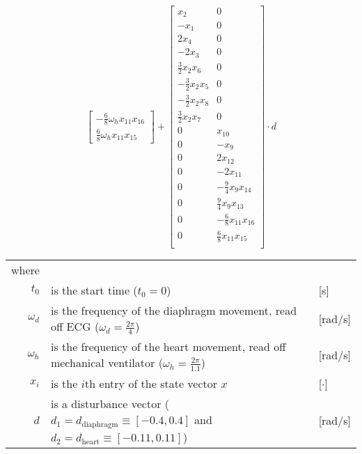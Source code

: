 \begin{equation}
\begin{bmatrix}
-\tfrac{6}{8} \omega_h x_{11} x_{16}\\
\tfrac{6}{8} \omega_h x_{11} x_{15}
\end{bmatrix}
+
\begin{bmatrix}
x_2&0\\
-x_1&  0\\
2 x_4& 0\\
-2 x_3&0\\
\tfrac{3}{2} x_2 x_6 & 0\\
-\tfrac{3}{2} x_2 x_5 & 0\\
-\tfrac{3}{2} x_2 x_8 & 0\\
\tfrac{3}{2} x_2 x_7  & 0\\
0& x_{10}\\
0& -x_9\\
0& 2 x_{12}\\
0& -2 x_{11}\\
0& -\tfrac{9}{4} x_9 x_{14}\\
0& \tfrac{9}{4} x_9 x_{13}\\
0& -\tfrac{6}{8} x_{11} x_{16}\\
0& \tfrac{6}{8} x_{11} x_{15}\\
\end{bmatrix}
\cdot d
\end{equation}
\vspace{-3mm}
\begin{tabular}{rll}
where & &\\
$t_0$ & is the start time ($t_0=0$) & [s]\\
$\omega_d$ & is the frequency of the diaphragm movement, read off ECG ($\omega_d=\tfrac{2\pi}{4}$) & [rad/s]\\
$\omega_h$ & is the frequency of the heart movement, read off mechanical ventilator ($\omega_h=\tfrac{2\pi}{1.1}$) & [rad/s]\\
$x_i$ & is the $i$th entry of the state vector $x$ & [$\cdot$]\\
$d$ & is a disturbance vector ($d_1=d_\text{diaphragm}\equiv [-0.4, 0.4]$ and $d_2=d_\text{heart}\equiv [-0.11,0.11]$) & [rad/s]
\end{tabular}
\vspace*{3mm}

